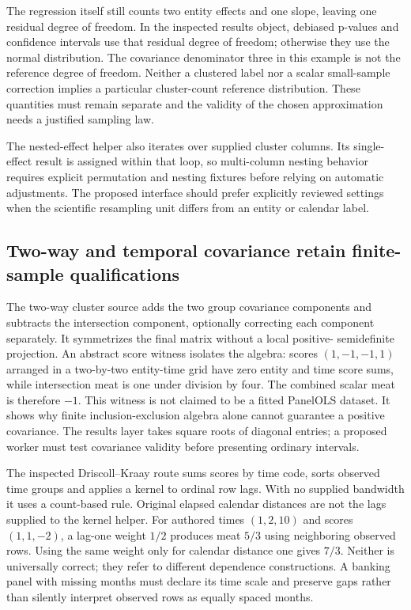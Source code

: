 The regression itself still counts two entity effects and one slope, leaving
one residual degree of freedom. In the inspected results object, debiased
p-values and confidence intervals use that residual degree of freedom;
otherwise they use the normal distribution. The covariance denominator
three in this example is not the reference degree of freedom. Neither a
clustered label nor a scalar small-sample correction implies a particular
cluster-count reference distribution. These quantities must remain separate
and the validity of the chosen approximation needs a justified sampling law.
\citep{exec24_lmpanel_source,exec24_lmpanel_reference}

The nested-effect helper also iterates over supplied cluster columns.
Its single-effect result is assigned within that loop, so multi-column
nesting behavior requires explicit permutation and nesting fixtures before
relying on automatic adjustments. The proposed interface should prefer
explicitly reviewed settings when the scientific resampling unit differs
from an entity or calendar label.\citep{exec24_lmpanel_source,exec24_lmpanel_reference}

\subsection{Two-way and temporal covariance retain finite-sample qualifications}
The two-way cluster source adds the two group covariance components and
subtracts the intersection component, optionally correcting each component
separately. It symmetrizes the final matrix without a local positive-
semidefinite projection. An abstract score witness isolates the algebra:
scores $(1,-1,-1,1)$ arranged in a two-by-two entity-time grid have zero
entity and time score sums, while intersection meat is one under division
by four. The combined scalar meat is therefore $-1$. This witness is not
claimed to be a fitted PanelOLS dataset. It shows why finite
inclusion-exclusion algebra alone cannot guarantee a positive covariance.
The results layer takes square roots of diagonal entries; a proposed worker
must test covariance validity before presenting ordinary intervals.
\citep{exec24_lmpanel_source,exec24_lmpanel_reference}

The inspected Driscoll--Kraay route sums scores by time code, sorts observed
time groups and applies a kernel to ordinal row lags. With no supplied
bandwidth it uses a count-based rule. Original elapsed calendar distances
are not the lags supplied to the kernel helper. For authored times
$(1,2,10)$ and scores $(1,1,-2)$, a lag-one weight $1/2$ produces meat
$5/3$ using neighboring observed rows. Using the same weight only for
calendar distance one gives $7/3$. Neither is universally correct; they
refer to different dependence constructions. A banking panel with missing
months must declare its time scale and preserve gaps rather than silently
interpret observed rows as equally spaced months.
\citep{exec24_lmpanel_source,exec24_lmpanel_reference}

